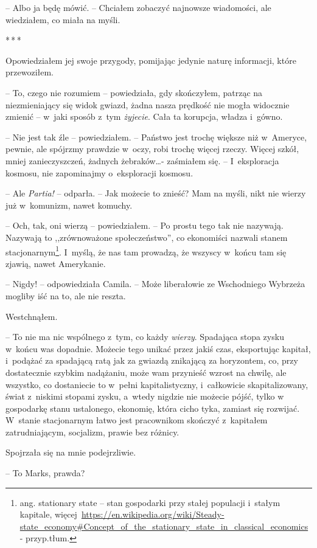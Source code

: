\documentclass[oneside,polish,12pt,sfheadings]{mwbk}
\newcommand{\threeast}{\bigskip\par\centerline{*\,*\,*}\medskip\par}%
\begin{document}
-- Albo ja będę mówić. -- Chciałem zobaczyć najnowsze wiadomości, ale
wiedziałem, co miała na myśli.

\threeast

Opowiedziałem jej swoje przygody, pomijając jedynie naturę informacji,
które przewoziłem.

-- To, czego nie rozumiem -- powiedziała, gdy skończyłem, patrząc na
niezmieniający się widok gwiazd, żadna nasza prędkość nie mogła
widocznie zmienić -- w~jaki sposób z~tym \emph{żyjecie}. Cała ta
korupcja, władza i~gówno.

-- Nie jest tak źle -- powiedziałem. -- Państwo jest trochę większe niż w~Ameryce, pewnie, ale spójrzmy prawdzie w~oczy, robi trochę więcej
rzeczy. Więcej szkół, mniej zanieczyszczeń, żadnych żebraków\ldots -
zaśmiałem się. -- I~eksploracja kosmosu, nie zapominajmy o~eksploracji
kosmosu.

-- Ale \emph{Partia!} -- odparła. -- Jak możecie to znieść? Mam na myśli,
nikt nie wierzy już w~komunizm, nawet komuchy.

-- Och, tak, oni wierzą -- powiedziałem. -- Po prostu tego tak nie
nazywają. Nazywają to ,,zrównoważone społeczeństwo'', co ekonomiści
nazwali stanem stacjonarnym\footnote{ang. stationary
state -- stan gospodarki przy stałej populacji i~stałym kapitale, więcej~\url{https://en.wikipedia.org/wiki/Steady-state\_economy\#Concept\_of\_the\_stationary\_state\_in\_classical\_economics}
- przyp.tłum.}. I~myślą, że nas tam prowadzą, że wszyscy w~końcu tam
się zjawią, nawet Amerykanie.

-- Nigdy! -- odpowiedziała Camila. -- Może liberałowie ze Wschodniego
Wybrzeża mogliby iść na to, ale nie reszta.

Westchnąłem. 

-- To nie ma nic wspólnego z~tym, co każdy \emph{wierzy}.
Spadająca stopa zysku w~końcu was dopadnie. Możecie tego unikać przez
jakiś czas, eksportując kapitał, i~podążać za spadającą ratą jak za
gwiazdą znikającą za horyzontem, co, przy dostatecznie szybkim
nadążaniu, może wam przynieść wzrost na chwilę, ale wszystko, co
dostaniecie to w~pełni kapitalistyczny, i~całkowicie skapitalizowany,
świat z~niskimi stopami zysku, a~wtedy nigdzie nie możecie pójść, tylko
w gospodarkę stanu ustalonego, ekonomię, która cicho tyka, zamiast się
rozwijać. W~stanie stacjonarnym łatwo jest pracownikom skończyć z~kapitałem zatrudniającym, socjalizm, prawie bez różnicy.

Spojrzała się na mnie podejrzliwie.

-- To Marks, prawda?
\end{document}
